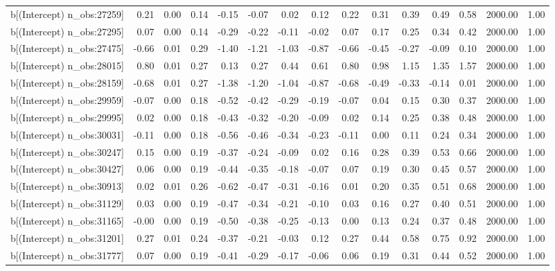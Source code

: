 \begin{table}[ht]
\begin{tabular}{rrrrrrrrrrrrrrr}
  b[(Intercept) n\_obs:27259] & 0.21 & 0.00 & 0.14 & -0.15 & -0.07 & 0.02 & 0.12 & 0.22 & 0.31 & 0.39 & 0.49 & 0.58 & 2000.00 & 1.00 \\ 
  b[(Intercept) n\_obs:27295] & 0.07 & 0.00 & 0.14 & -0.29 & -0.22 & -0.11 & -0.02 & 0.07 & 0.17 & 0.25 & 0.34 & 0.42 & 2000.00 & 1.00 \\ 
  b[(Intercept) n\_obs:27475] & -0.66 & 0.01 & 0.29 & -1.40 & -1.21 & -1.03 & -0.87 & -0.66 & -0.45 & -0.27 & -0.09 & 0.10 & 2000.00 & 1.00 \\ 
  b[(Intercept) n\_obs:28015] & 0.80 & 0.01 & 0.27 & 0.13 & 0.27 & 0.44 & 0.61 & 0.80 & 0.98 & 1.15 & 1.35 & 1.57 & 2000.00 & 1.00 \\ 
  b[(Intercept) n\_obs:28159] & -0.68 & 0.01 & 0.27 & -1.38 & -1.20 & -1.04 & -0.87 & -0.68 & -0.49 & -0.33 & -0.14 & 0.01 & 2000.00 & 1.00 \\ 
  b[(Intercept) n\_obs:29959] & -0.07 & 0.00 & 0.18 & -0.52 & -0.42 & -0.29 & -0.19 & -0.07 & 0.04 & 0.15 & 0.30 & 0.37 & 2000.00 & 1.00 \\ 
  b[(Intercept) n\_obs:29995] & 0.02 & 0.00 & 0.18 & -0.43 & -0.32 & -0.20 & -0.09 & 0.02 & 0.14 & 0.25 & 0.38 & 0.48 & 2000.00 & 1.00 \\ 
  b[(Intercept) n\_obs:30031] & -0.11 & 0.00 & 0.18 & -0.56 & -0.46 & -0.34 & -0.23 & -0.11 & 0.00 & 0.11 & 0.24 & 0.34 & 2000.00 & 1.00 \\ 
  b[(Intercept) n\_obs:30247] & 0.15 & 0.00 & 0.19 & -0.37 & -0.24 & -0.09 & 0.02 & 0.16 & 0.28 & 0.39 & 0.53 & 0.66 & 2000.00 & 1.00 \\ 
  b[(Intercept) n\_obs:30427] & 0.06 & 0.00 & 0.19 & -0.44 & -0.35 & -0.18 & -0.07 & 0.07 & 0.19 & 0.30 & 0.45 & 0.57 & 2000.00 & 1.00 \\ 
  b[(Intercept) n\_obs:30913] & 0.02 & 0.01 & 0.26 & -0.62 & -0.47 & -0.31 & -0.16 & 0.01 & 0.20 & 0.35 & 0.51 & 0.68 & 2000.00 & 1.00 \\ 
  b[(Intercept) n\_obs:31129] & 0.03 & 0.00 & 0.19 & -0.47 & -0.34 & -0.21 & -0.10 & 0.03 & 0.16 & 0.27 & 0.40 & 0.51 & 2000.00 & 1.00 \\ 
  b[(Intercept) n\_obs:31165] & -0.00 & 0.00 & 0.19 & -0.50 & -0.38 & -0.25 & -0.13 & 0.00 & 0.13 & 0.24 & 0.37 & 0.48 & 2000.00 & 1.00 \\ 
  b[(Intercept) n\_obs:31201] & 0.27 & 0.01 & 0.24 & -0.37 & -0.21 & -0.03 & 0.12 & 0.27 & 0.44 & 0.58 & 0.75 & 0.92 & 2000.00 & 1.00 \\ 
  b[(Intercept) n\_obs:31777] & 0.07 & 0.00 & 0.19 & -0.41 & -0.29 & -0.17 & -0.06 & 0.06 & 0.19 & 0.31 & 0.44 & 0.52 & 2000.00 & 1.00 \\ 

\end{tabular}
\end{table}
